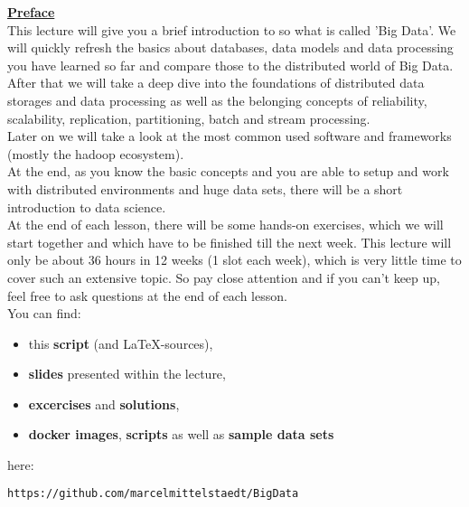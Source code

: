 
\underline{\textbf{\LARGE{Preface}}}\\[2cm]
This lecture will give you a brief introduction to so what is called 'Big Data'. We will quickly refresh the basics about databases, data models and data processing you have learned so far and compare those to the distributed world of Big Data. \\
After that we will take a deep dive into the foundations of distributed data storages and data processing as well as the belonging concepts of reliability, scalability, replication, partitioning, batch and stream processing. \\
Later on we will take a look at the most common used software and frameworks (mostly the hadoop ecosystem). \\
At the end, as you know the basic concepts and you are able to setup and work with distributed environments and huge data sets, there will be a short introduction to data science. \\

At the end of each lesson, there will be some hands-on exercises, which we will start together and which have to be finished till the next week.
This lecture will only be about 36 hours in 12 weeks (1 slot each week), which is very little time to cover such an extensive topic. So pay close attention and if you can't keep up, feel free to ask questions at the end of each lesson. \\

You can find:
\begin{samepage}
\begin{itemize}
	\item this \textbf{script} (and \LaTeX{}-sources),
	\item \textbf{slides} presented within the lecture,
	\item \textbf{excercises} and \textbf{solutions},
	\item \textbf{docker images}, \textbf{scripts} as well as \textbf{sample data sets}
\end{itemize}
\end{samepage}
here:
\begin{lstlisting}[language=bash,frame=none,numbers=none,xleftmargin=0.05\textwidth,xrightmargin=0.05\textwidth]
 https://github.com/marcelmittelstaedt/BigData
\end{lstlisting}

